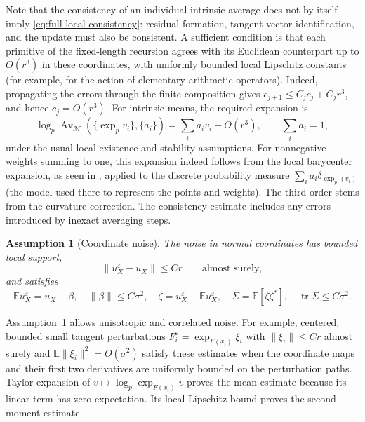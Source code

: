 \documentclass[12pt]{article}
\newtheorem{assumption}{Assumption}[section]
\newcommand{\M}{\mathcal{M}}
\begin{document}
Note that the consistency of an individual intrinsic average does not by itself imply \eqref{eq:full-local-consistency}: residual formation, tangent-vector identification, and the update must also be consistent. A sufficient condition is that each primitive of the fixed-length recursion agrees with its Euclidean counterpart up to $O(r^3)$ in these coordinates, with uniformly bounded local Lipschitz constants (for example, for the action of elementary arithmetic operators). Indeed, propagating the errors through the finite composition gives $c_{j+1}\leq C_jc_j+C_jr^3$, and hence $c_j=O(r^3)$. For intrinsic means, the required expansion is
\[
 \log_p\operatorname{Av}_{\M}(\{\exp_pv_i\},\{a_i\})
 =\sum_i a_iv_i+O(r^3),
 \qquad \sum_i a_i=1,
\]
under the usual local existence and stability assumptions. For nonnegative weights summing to one, this expansion indeed follows from the local barycenter expansion, as seen in \cite[Theorem~5]{pennec2019curvature}, applied to the discrete probability measure $\sum_i a_i\delta_{\exp_p(v_i)}$ (the model used there to represent the points and weights). The third order stems from the curvature correction. The consistency estimate includes any errors introduced
by inexact averaging steps.

\begin{assumption}[Coordinate noise]\label{ass:noise}
The noise in normal coordinates has bounded local support,
\begin{equation}\label{eq:bounded-noise}
 \|u_X^\varepsilon-u_X\|\leq Cr \qquad\text{almost surely},
\end{equation}
and satisfies
\begin{equation}\label{eq:coordinate-noise-local}
 \mathbb E u_X^\varepsilon=u_X+\beta,
 \quad \|\beta\|\leq C\sigma^2,
 \quad \zeta=u_X^\varepsilon-\mathbb E u_X^\varepsilon,
 \quad \Sigma=\mathbb E[\zeta\zeta^*],
 \quad \operatorname{tr}\Sigma\leq C\sigma^2.
\end{equation}
\end{assumption}

Assumption~\ref{ass:noise} allows anisotropic and correlated noise. For example, centered, bounded small tangent perturbations $F_i^\varepsilon=\exp_{F(x_i)}\xi_i$ with $\|\xi_i\|\leq Cr$ almost surely and $\mathbb E\|\xi_i\|^2=O(\sigma^2)$ satisfy these estimates when the coordinate maps and their first two derivatives are uniformly bounded on the perturbation paths. Taylor expansion of $v\mapsto\log_p\exp_{F(x_i)}v$ proves the mean estimate because its linear term has zero expectation. Its local Lipschitz bound proves the second-moment estimate.
\end{document}

